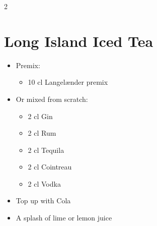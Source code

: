 \documentclass[a4paper,12pt]{article}
\begin{document}
\begin{multicols}{2}
\section*{Long Island Iced Tea}
\begin{itemize}
    \item Premix:
    \begin{itemize}
        \item 10 cl Langelænder premix
    \end{itemize}
    \item Or mixed from scratch:
    \begin{itemize}
        \item 2 cl Gin
        \item 2 cl Rum
        \item 2 cl Tequila
        \item 2 cl Cointreau
        \item 2 cl Vodka
    \end{itemize}
    \item Top up with Cola
    \item A splash of lime or lemon juice
\end{itemize}


\end{multicols}
\end{document}
